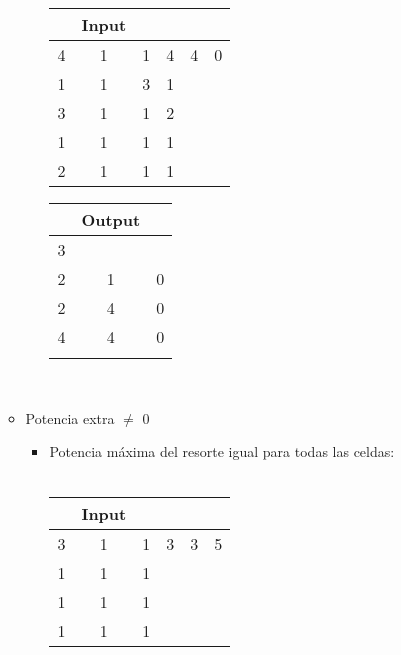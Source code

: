 \documentclass[11pt, a4paper, twoside]{article}
\begin{document}
\begin{itemize}
\begin{itemize}
\begin{itemize}
					\begin{minipage}{0.4\textwidth}
							\begin{tabular}{cccccc}
							 & Input \\
							   \hline
							   4 & 1 & 1 & 4 & 4 & 0\\
							   1 & 1 & 3 & 1 &   &  \\
							   3 & 1 & 1 & 2 &   &  \\
							   1 & 1 & 1 & 1 &   &  \\
							   2 & 1 & 1 & 1 &   &  \\
							\end{tabular}
						\end{minipage} 
							\begin{minipage}{0.3\textwidth}
								\begin{tabular}{ccc}
								  & Output \\
								   \hline
								   3 &   &   \\
								   2 & 1 & 0 \\
								   2 & 4 & 0 \\
								   4 & 4 & 0 \\
								    \\
							\end{tabular}
					\end{minipage} 	\\
			\end{itemize} 
		\item Potencia extra $\ne$ 0 \\
			\begin{itemize}
				\item Potencia máxima del resorte igual para todas las celdas:\\
				\\
					\begin{minipage}{0.4\textwidth}
							\begin{tabular}{cccccc}
							 & Input \\
							   \hline
							   3 & 1 & 1 & 3 & 3 & 5\\
							   1 & 1 & 1 &   &   &  \\
							   1 & 1 & 1 &   &   &  \\
							   1 & 1 & 1 &   &   &  \\
							\end{tabular}
						\end{minipage} 
						\begin{minipage}{0.3\textwidth}
							\begin{tabular}{ccc}

\end{tabular}
\end{minipage}
\end{itemize}
\end{itemize}
\end{itemize}
\end{document}
